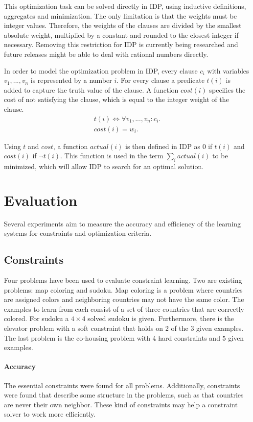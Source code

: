 \documentclass{llncs}
\begin{document}
This optimization task can be solved directly in IDP, using inductive definitions, aggregates and minimization.
The only limitation is that the weights must be integer values.
Therefore, the weights of the clauses are divided by the smallest absolute weight, multiplied by a constant and rounded to the closest integer if necessary.
Removing this restriction for IDP is currently being researched and future releases might be able to deal with rational numbers directly.

In order to model the optimization problem in IDP, every clause $c_i$ with variables $v_1, ..., v_n$ is represented by a number $i$. For every clause a predicate $t(i)$ is added to capture the truth value of the clause.
A function $\mathit{cost}(i)$ specifies the cost of not satisfying the clause, which is equal to the integer weight of the clause.
\begin{eqnarray*}
  t(i) \Leftrightarrow \forall v_1, ..., v_n : c_i. \\
  cost(i) = w_i.
\end{eqnarray*}

Using $t$ and $\mathit{cost}$, a function $\mathit{actual}(i)$ is then defined in IDP as 0 if $t(i)$ and $\mathit{cost}(i)$ if $\lnot t(i)$.
This function is used in the term $\sum_i actual(i)$ to be minimized, which will allow IDP to search for an optimal solution.

\section{Evaluation}
Several experiments aim to measure the accuracy and efficiency of the learning systems for constraints and optimization criteria.

\subsection{Constraints}
Four problems have been used to evaluate constraint learning.
Two are existing problems: map coloring and sudoku.
Map coloring is a problem where countries are assigned colors and neighboring countries may not have the same color.
The examples to learn from each consist of a set of three countries that are correctly colored.
For sudoku a $4 \times 4$ solved sudoku is given.
Furthermore, there is the elevator problem with a soft constraint that holds on 2 of the 3 given examples.
The last problem is the co-housing problem with 4 hard constraints and 5 given examples.

\paragraph{Accuracy}
The essential constraints were found for all problems.
Additionally, constraints were found that describe some structure in the problems, such as that countries are never their own neighbor.
These kind of constraints may help a constraint solver to work more efficiently.
\end{document}
